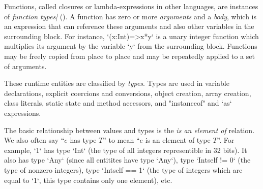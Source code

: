 Functions, called closures or lambda-expressions in other languages, are
instances of {\em function types|} (). 
A function has zero or more {\em arguments} and a {\em body}, which is
an expression that can reference these arguments and also other
variables in the surrounding block. For instance, \xcd`(x:Int)=>x*y`
is a unary integer function which multiplies its argument by the
variable \xcd`y` from the surrounding block.  Functions may be freely
copied from place to place and may be repeatedly applied to a set of
arguments.

These runtime entities are classified by {\em types}. Types are used in
variable declarations, explicit coercions and conversions, object creation,
array creation, class literals, static state and method accessors, and
\xcd"instanceof" and \xcd`as` expressions.


The basic relationship between values and types is the {\em is an
  element of} relation.  We also often say ``$e$ has type $T$'' to
mean ``$e$ is an element of type $T$''.  For example, \xcd`1` has type
\xcd`Int` (the type of all integers representible in 32 bits). It also
has type \xcd`Any` (since all entitites have type \xcd`Any`), type
\xcd`Int{self != 0}` (the type of nonzero integers), type
\xcd`Int{self == 1}` (the type of integers which are equal to \xcd`1`,
this type contains only one element), etc.


